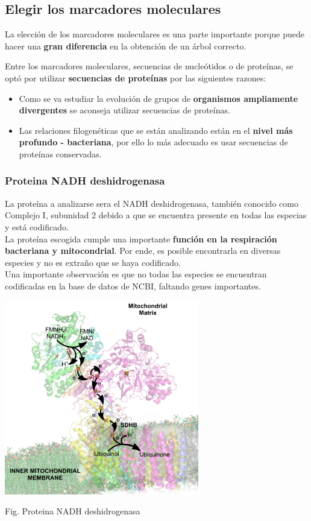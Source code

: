 \documentclass[a4paper]{article}
\begin{document}
\subsection{Elegir los marcadores moleculares}
La elección de los marcadores moleculares es una parte importante porque puede hacer una \textbf{gran diferencia} en la
obtención de un árbol correcto.

\noindent Entre los marcadores moleculares, secuencias de nucleótidos o de proteínas, se optó por utilizar \textbf{secuencias de proteínas} por las siguientes razones:


\begin{itemize}
	\item Como se va estudiar la evolución de grupos de \textbf{organismos ampliamente divergentes} se aconseja utilizar secuencias de proteínas.
	\item Las relaciones filogenéticas que se están analizando están en el \textbf{nivel más profundo - bacteriana}, por ello lo más adecuado es usar secuencias de proteínas conservadas.
\end{itemize}


\subsubsection{Proteina NADH deshidrogenasa}

La proteína a analizarse sera el NADH deshidrogenasa, también conocido como Complejo I, subunidad 2 debido a que se encuentra presente en todas las especias y está codificado. \\
La proteína escogida cumple una importante \textbf{función en la respiración bacteriana y mitocondrial}. Por ende, es posible encontrarla en diversas especies y no es extraño que se haya codificado.\\
Una importante observación es que no todas las especies se encuentran codificadas en la base de datos de NCBI, faltando genes importantes.

\begin{center}
	\includegraphics[width=8.5cm,height=8.5cm]{NADH.png}
	
	Fig. Proteina NADH deshidrogenasa
\end{center}
\end{document}

